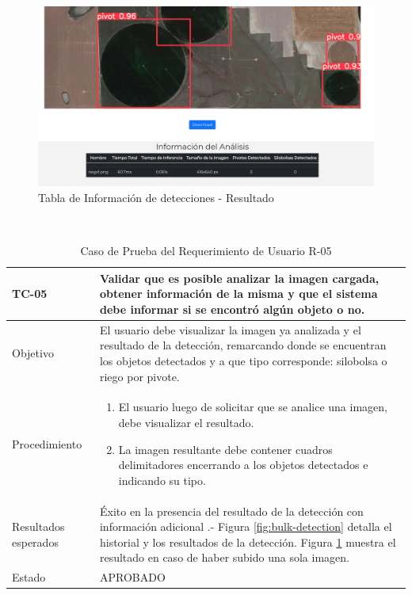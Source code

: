 \begin{figure}[h!]
    \centering
    \includegraphics[width=1\textwidth]{img/FE - detection info table.png}
    \caption{Tabla de Información de detecciones - Resultado}
    \label{fig:tabla result}
\end{figure}

\hfill \break
\\

\begin{table}[h!]
    \begin{tabular}{ | p{3cm} |p{9cm}| }
        \hline
        \rowcolor[HTML]{d6d8ff}
        TC-05 & Validar que es posible analizar la imagen cargada, obtener información de la misma y que el sistema debe informar si se encontró algún objeto o no.\\
        \hline
        Objetivo & El usuario debe visualizar la imagen ya analizada y el resultado de la detección, remarcando donde se encuentran los objetos detectados y a que tipo corresponde: silobolsa o riego por pivote.\\
        \hline
        Procedimiento & \begin{enumerate}
            \item El usuario luego de solicitar que se analice una imagen, debe visualizar el resultado.
            \item La imagen resultante debe contener cuadros delimitadores encerrando a los objetos detectados e indicando su tipo.
        \end{enumerate}
        \\
        \hline
        Resultados esperados & Éxito en la presencia del resultado de la detección con información adicional .- Figura \ref{fig:bulk-detection} detalla el historial y los resultados de la detección. Figura \ref{fig:tabla result} muestra el resultado en caso de haber subido una sola imagen.\\
        \hline
        Estado & APROBADO \\
        \hline
    \end{tabular}\\
    \caption{Caso de Prueba del Requerimiento de Usuario R-05}
    \label{pruebar5}
\end{table}

